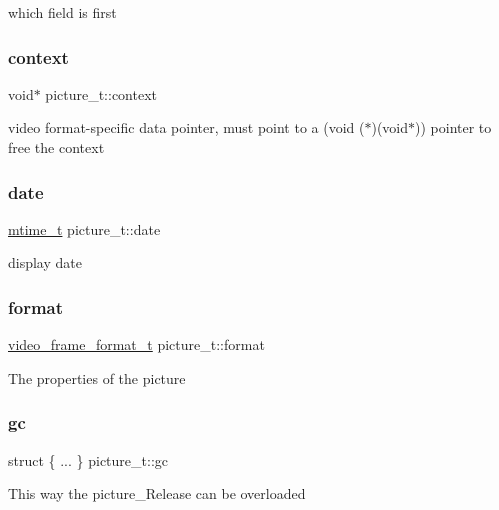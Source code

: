 which field is first \mbox{\label{structpicture__t_a3c8b72660e630a92591a2798ad2d0661}} 
\subsubsection{\texorpdfstring{context}{context}}
{\footnotesize\ttfamily void$\ast$ picture\+\_\+t\+::context}

video format-\/specific data pointer, must point to a (void ($\ast$)(void$\ast$)) pointer to free the context \mbox{\label{structpicture__t_a8a6e012c14177a7ddab81f88508da5a4}} 
\subsubsection{\texorpdfstring{date}{date}}
{\footnotesize\ttfamily \hyperlink{vlc__common_8h_a996e47c5ea061215703c26738351279e}{mtime\+\_\+t} picture\+\_\+t\+::date}

display date \mbox{\label{structpicture__t_a72ac7f1bbca75864dbcd39f4125639de}} 
\subsubsection{\texorpdfstring{format}{format}}
{\footnotesize\ttfamily \hyperlink{structvideo__format__t}{video\+\_\+frame\+\_\+format\+\_\+t} picture\+\_\+t\+::format}

The properties of the picture \mbox{\label{structpicture__t_a2273f9c1364e15297b25164d27193acf}} 
\subsubsection{\texorpdfstring{gc}{gc}}
{\footnotesize\ttfamily struct \{ ... \}   picture\+\_\+t\+::gc}

This way the picture\+\_\+\+Release can be overloaded \mbox{\label{structpicture__t_a0a35d4f969c33945d785743de590e5d5}} 
